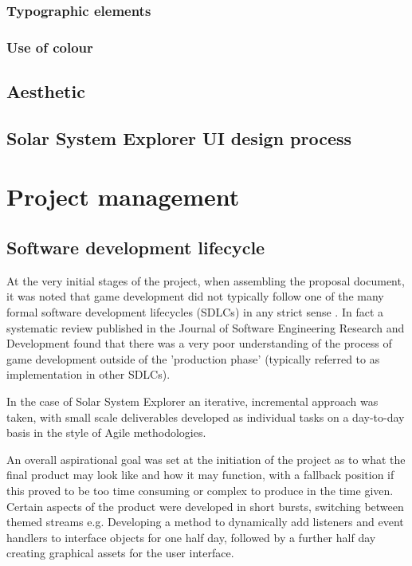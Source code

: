 \documentclass[twoside]{bhamthesis}
\begin{document}
\subsubsection{Typographic elements}

\subsubsection{Use of colour}

\subsection{Aesthetic}

\subsection{Solar System Explorer UI design process}


\section{Project management}

\subsection{Software development lifecycle}
At the very initial stages of the project, when assembling the proposal document, it was noted that game development did not typically follow one of the many formal software development lifecycles (SDLCs) in any strict sense \cite{ramadan_game_2013}. In fact a systematic review published in the Journal of Software Engineering Research and Development found that there was a very poor understanding of the process of game development outside of the 'production phase' (typically referred to as implementation in other SDLCs).

In the case of Solar System Explorer an iterative, incremental approach was taken, with small scale deliverables developed as individual tasks on a day-to-day basis in the style of Agile methodologies.

An overall aspirational goal was set at the initiation of the project as to what the final product may look like and how it may function, with a fallback position if this proved to be too time consuming or complex to produce in the time given. Certain aspects of the product were developed in short bursts, switching between themed streams e.g. Developing a method to dynamically add listeners and event handlers to interface objects for one half day, followed by a further half day creating graphical assets for the user interface.
\end{document}
